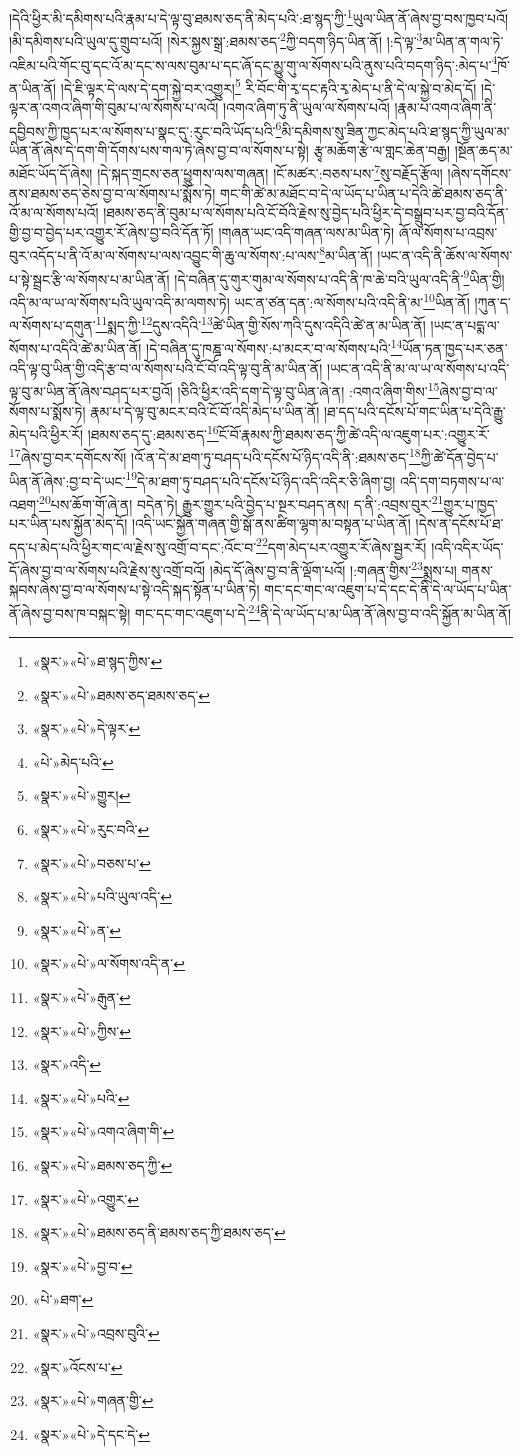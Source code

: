 །དེའི་ཕྱིར་མི་དམིགས་པའི་རྣམ་པ་དེ་ལྟ་བུ་ཐམས་ཅད་ནི་མེད་པའི་:ཐ་སྙད་ཀྱི་\footnote{«སྣར་»«པེ་»ཐ་སྙད་ཀྱིས་}ཡུལ་ཡིན་ནོ་ཞེས་བྱ་བས་ཁྱབ་པའོ། །མི་དམིགས་པའི་ཡུལ་དུ་གྲུབ་པའོ། །སེར་སྐྱས་སྒྲ་:ཐམས་ཅད་\footnote{«སྣར་»«པེ་»ཐམས་ཅད་ཐམས་ཅད་}ཀྱི་བདག་ཉིད་ཡིན་ནོ། །:དེ་ལྟ་\footnote{«སྣར་»«པེ་»དེ་ལྟར་}མ་ཡིན་ན་གལ་ཏེ་འཇིམ་པའི་གོང་བུ་དང་འོ་མ་དང་ས་ལས་བུམ་པ་དང་ཞོ་དང་མྱུ་གུ་ལ་སོགས་པའི་ནུས་པའི་བདག་ཉིད་:མེད་པ་\footnote{«པེ་»མེད་པའི་}ཁོ་ན་ཡིན་ནོ། །དེ་ཇི་ལྟར་དེ་ལས་དེ་དག་སྐྱེ་བར་འགྱུར།\footnote{«སྣར་»«པེ་»གྱུར།} རི་བོང་གི་རྭ་དང་རྟའི་རྭ་མེད་པ་ནི་དེ་ལ་སྐྱེ་བ་མེད་དོ། །དེ་ལྟར་ན་འགའ་ཞིག་གི་བུམ་པ་ལ་སོགས་པ་ལའོ། །འགའ་ཞིག་ཏུ་ནི་ཡུལ་ལ་སོགས་པའོ། །རྣམ་པ་འགའ་ཞིག་ནི་དབྱིབས་ཀྱི་ཁྱད་པར་ལ་སོགས་པ་སྣང་དུ་:རུང་བའི་ཡོད་པའི་\footnote{«སྣར་»«པེ་»རུང་བའི་}མི་དམིགས་སུ་ཟིན་ཀྱང་མེད་པའི་ཐ་སྙད་ཀྱི་ཡུལ་མ་ཡིན་ནོ་ཞེས་དེ་དག་གི་དོགས་པས་གལ་ཏེ་ཞེས་བྱ་བ་ལ་སོགས་པ་སྟེ། རྩྭ་མཆོག་རྩེ་ལ་གླང་ཆེན་བརྒྱ། །སྔོན་ཆད་མ་མཐོང་ཡོད་དོ་ཞེས། །དེ་སྐད་གྲངས་ཅན་ཕྱུགས་ལས་གཞན། །ངོ་མཚར་:བཅས་པས་\footnote{«སྣར་»«པེ་»བཅས་པ་}སུ་བརྗོད་རྩོལ། །ཞེས་དགོངས་ནས་ཐམས་ཅད་ཅེས་བྱ་བ་ལ་སོགས་པ་སྨོས་ཏེ། གང་གི་ཚེ་མ་མཐོང་བ་དེ་ལ་ཡོད་པ་ཡིན་པ་དེའི་ཚེ་ཐམས་ཅད་ནི་འོ་མ་ལ་སོགས་པའོ། །ཐམས་ཅད་ནི་བུམ་པ་ལ་སོགས་པའི་ངོ་བོའི་རྗེས་སུ་བྱེད་པའི་ཕྱིར་དེ་བསྒྲུབ་པར་བྱ་བའི་དོན་གྱི་བྱ་བ་བྱེད་པར་འགྱུར་རོ་ཞེས་བྱ་བའི་དོན་ཏོ། །གཞན་ཡང་འདི་གཞན་ལས་མ་ཡིན་ཏེ། ཞོ་ལ་སོགས་པ་འབྲས་བུར་འདོད་པ་ནི་འོ་མ་ལ་སོགས་པ་ལས་འབྱུང་གི་ཆུ་ལ་སོགས་:པ་ལས་\footnote{«སྣར་»«པེ་»པའི་ཡུལ་འདི་}མ་ཡིན་ནོ། །ཡང་ན་འདི་ནི་ཆོས་ལ་སོགས་པ་སྟེ་སྦྲང་རྩི་ལ་སོགས་པ་མ་ཡིན་ནོ། །དེ་བཞིན་དུ་གུར་གུམ་ལ་སོགས་པ་འདི་ནི་ཁ་ཆེ་བའི་ཡུལ་འདི་ནི་\footnote{«སྣར་»«པེ་»ན་}ཡིན་གྱི། འདི་མ་ལ་ཡ་ལ་སོགས་པའི་ཡུལ་འདི་མ་ལགས་ཏེ། ཡང་ན་ཙན་དན་:ལ་སོགས་པའི་འདི་ནི་མ་\footnote{«སྣར་»«པེ་»ལ་སོགས་འདི་ན་}ཡིན་ནོ། །ཀུན་ད་ལ་སོགས་པ་དགུན་\footnote{«སྣར་»«པེ་»རྒུན་}སྨད་ཀྱི་\footnote{«སྣར་»«པེ་»ཀྱིས་}དུས་འདིའི་\footnote{«སྣར་»འདི་}ཚེ་ཡིན་གྱི་སོས་ཀའི་དུས་འདིའི་ཚེ་ན་མ་ཡིན་ནོ། །ཡང་ན་པདྨ་ལ་སོགས་པ་འདིའི་ཚེ་མ་ཡིན་ནོ། །དེ་བཞིན་དུ་ཁཎྜ་ལ་སོགས་:པ་མངར་བ་ལ་སོགས་པའི་\footnote{«སྣར་»«པེ་»པའི་}ཡོན་ཏན་ཁྱད་པར་ཅན་འདི་ལྟ་བུ་ཡིན་གྱི་འདི་རྩ་བ་ལ་སོགས་པའི་ངོ་བོ་འདི་ལྟ་བུ་ནི་མ་ཡིན་ནོ། །ཡང་ན་འདི་ནི་མ་ལ་ཡ་ལ་སོགས་པ་འདི་ལྟ་བུ་མ་ཡིན་ནོ་ཞེས་བཤད་པར་བྱའོ། །ཅིའི་ཕྱིར་འདི་དག་དེ་ལྟ་བུ་ཡིན་ཞེ་ན། :འགའ་ཞིག་གིས་\footnote{«སྣར་»«པེ་»འགའ་ཞིག་གི་}ཞེས་བྱ་བ་ལ་སོགས་པ་སྨོས་ཏེ། རྣམ་པ་དེ་ལྟ་བུ་མངར་བའི་ངོ་བོ་འདི་མེད་པ་ཡིན་ནོ། །ཐ་དད་པའི་དངོས་པོ་གང་ཡིན་པ་དེའི་རྒྱུ་མེད་པའི་ཕྱིར་རོ། །ཐམས་ཅད་དུ་:ཐམས་ཅད་\footnote{«སྣར་»«པེ་»ཐམས་ཅད་ཀྱི་}ངོ་བོ་རྣམས་ཀྱི་ཐམས་ཅད་ཀྱི་ཚེ་འདི་ལ་འཇུག་པར་:འགྱུར་རོ་\footnote{«སྣར་»«པེ་»འགྱུར་}ཞེས་བྱ་བར་དགོངས་སོ། །འོ་ན་དེ་མ་ཐག་ཏུ་བཤད་པའི་དངོས་པོ་ཉིད་འདི་ནི་:ཐམས་ཅད་\footnote{«སྣར་»«པེ་»ཐམས་ཅད་ནི་ཐམས་ཅད་ཀྱི་ཐམས་ཅད་}ཀྱི་ཚེ་དོན་བྱེད་པ་ཡིན་ནོ་ཞེས་:བྱ་བ་དེ་ཡང་\footnote{«སྣར་»«པེ་»བྱ་བ་}དེ་མ་ཐག་ཏུ་བཤད་པའི་དངོས་པོ་ཉིད་འདི་འདིར་ཅི་ཞིག་བྱ། འདི་དག་བཏགས་པ་ལ་འཐག་\footnote{«པེ་»ཐག་}པས་ཆོག་གོ་ཞེ་ན། བདེན་ཏེ། རྒྱུར་གྱུར་པའི་བྱེད་པ་སྔར་བཤད་ནས། ད་ནི་:འབྲས་བུར་\footnote{«སྣར་»«པེ་»འབྲས་བུའི་}གྱུར་པ་ཁྱད་པར་ཡིན་པས་སྐྱོན་མེད་དོ། །འདི་ཡང་སྐྱོན་གཞན་གྱི་སྒོ་ནས་ཚིག་ལྷག་མ་བསྟན་པ་ཡིན་ནོ། །དེས་ན་དངོས་པོ་ཐ་དད་པ་མེད་པའི་ཕྱིར་གང་ལ་རྗེས་སུ་འགྲོ་བ་དང་:འོང་བ་\footnote{«སྣར་»འོངས་པ་}དག་མེད་པར་འགྱུར་རོ་ཞེས་སྦྱར་རོ། །འདི་འདིར་ཡོད་དོ་ཞེས་བྱ་བ་ལ་སོགས་པའི་རྗེས་སུ་འགྲོ་བའོ། །མེད་དོ་ཞེས་བྱ་བ་ནི་ལྡོག་པའོ། །:གཞན་གྱིས་\footnote{«སྣར་»«པེ་»གཞན་གྱི་}སྨྲས་པ། གནས་སྐབས་ཞེས་བྱ་བ་ལ་སོགས་པ་སྟེ་འདི་སྐད་སྟོན་པ་ཡིན་ཏེ། གང་དང་གང་ལ་འཇུག་པ་དེ་དང་དེ་ནི་དེ་ལ་ཡོད་པ་ཡིན་ནོ་ཞེས་བྱ་བས་ཁ་བསྐང་སྟེ། གང་དང་གང་འཇུག་པ་དེ་\footnote{«སྣར་»«པེ་»དེ་དང་དེ་}ནི་དེ་ལ་ཡོད་པ་མ་ཡིན་ནོ་ཞེས་བྱ་བ་འདི་སྐྱོན་མ་ཡིན་ནོ། 